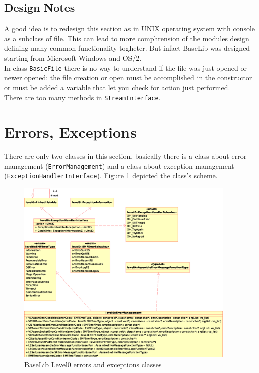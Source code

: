 \subsection{Design Notes}
A good idea is to redesign this section as in UNIX operating system with console as a subclass of file. This can lead to more comphrension of the modules design defining many common functionality togheter. But infact BaseLib was designed starting from Microsoft Windows and OS/2.\\


In class \texttt{BasicFile} there is no way to understand if the file was just opened or newer opened: the file creation or open must be accomplished in the constructor or must be added a variable that let you check for action just performed.\\

There are too many methods in \texttt{StreamInterface}.



\section{Errors, Exceptions}
There are only two classes in this section, basically there is a class about error management (\texttt{ErrorManagement}) and a class about exception management (\texttt{ExceptionHandlerInterface}). Figure \ref{f:level0:err} depicted the class's scheme.

\begin{figure}[h!]
 \begin{center}
  \includegraphics[width=0.93\textwidth]{level0/level0-err.eps}
  \caption{BaseLib Level0 errors and exceptions classes}
  \label{f:level0:err}
 \end{center}
\end{figure}


